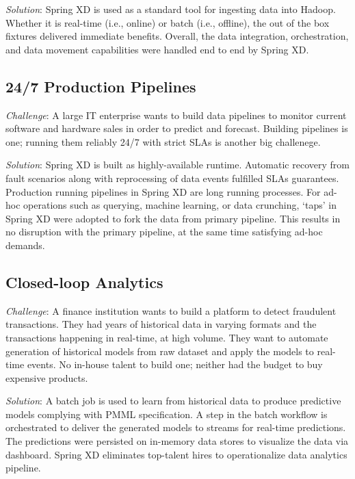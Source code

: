 \textit{Solution}: Spring XD is used as a standard tool for ingesting data 
into Hadoop. Whether it is real-time (i.e., online) or batch (i.e., offline),
the out of the box fixtures delivered immediate benefits. Overall, the data
integration, orchestration, and data movement capabilities were handled end
to end by Spring XD.

\subsection{24/7 Production Pipelines}
\textit{Challenge}: A large IT enterprise wants to build data pipelines to
monitor current software and hardware sales in order to predict and forecast.
Building pipelines is one; running them reliably 24/7 with strict SLAs is
another big challenege.

\textit{Solution}: Spring XD is built as highly-available runtime. Automatic
recovery from fault scenarios along with reprocessing of data events fulfilled
SLAs guarantees. Production running pipelines in Spring XD are long running
processes. For ad-hoc operations such as querying, machine learning, or
data crunching, `taps' in Spring XD were adopted to fork the data from primary
pipeline. This results in no disruption with the primary pipeline, at the
same time satisfying ad-hoc demands.

\subsection{Closed-loop Analytics}
\textit{Challenge}: A finance institution wants to build a platform to detect
fraudulent transactions. They had years of historical data in varying formats
and the transactions happening in real-time, at high volume. They want to
automate generation of historical models from raw dataset and apply the models
to real-time events. No in-house talent to build one; neither had the budget to buy expensive products.

\textit{Solution}: A batch job is used to learn from historical data to
produce predictive models complying with PMML specification. A step
in the batch workflow is orchestrated to deliver the generated models to
streams for real-time predictions. The predictions were persisted
on in-memory data stores to visualize the data via dashboard. Spring XD eliminates top-talent hires to operationalize data analytics pipeline.
